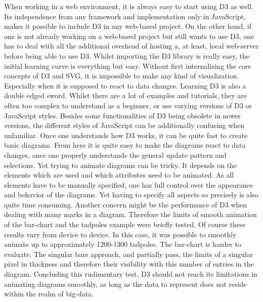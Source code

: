 When working in a web environment, it is always easy to start using D3 as well. Its independence from any framework and implementation only in JavaScript, makes it possible to include D3 in any web-based project. On the other hand, if one is not already working on a web-based project but still wants to use D3, one has to deal with all the additional overhead of hosting a, at least, local web-server before being able to use D3. Whilst importing the D3 library is really easy, the initial learning curve is everything but easy. Without first internalizing the core concepts of D3 and SVG, it is impossible to make any kind of visualization. Especially when it is supposed to react to data changes. Learning D3 is also a double edged sword. Whilst there are a lot of examples and tutorials, they are often too complex to understand as a beginner, or use varying versions of D3 or JavaScript styles. Besides some functionalities of D3 being obsolete in newer versions, the different styles of JavaScript can be additionally confusing when unfamiliar. Once one understands how D3 works, it can be quite fast to create basic diagrams. From here it is quite easy to make the diagrams react to data changes, once one properly understands the general update pattern and selections. Yet trying to animate diagrams can be tricky. It depends on the elements which are used and which attributes need to be animated. As all elements have to be manually specified, one has full control over the appearance and behavior of the diagrams. Yet having to specify all aspects so precisely is also quite time consuming. Another concern might be the performance of D3 when dealing with many marks in a diagram. Therefore the limits of smooth animation of the bar-chart and the tadpoles example\cite{bostock_2020} were briefly tested. Of course these results vary from device to device. In this case, it was possible to smoothly animate up to approximately 1200-1300 tadpoles. The bar-chart is harder to evaluate. The singular bars approach, and partially pass, the limits of a singular pixel in thickness and therefore their visibility with this number of entries in the diagram. Concluding this rudimentary test, D3 should not reach its limitations in animating diagrams smoothly, as long as the data to represent does not reside within the realm of big-data.


